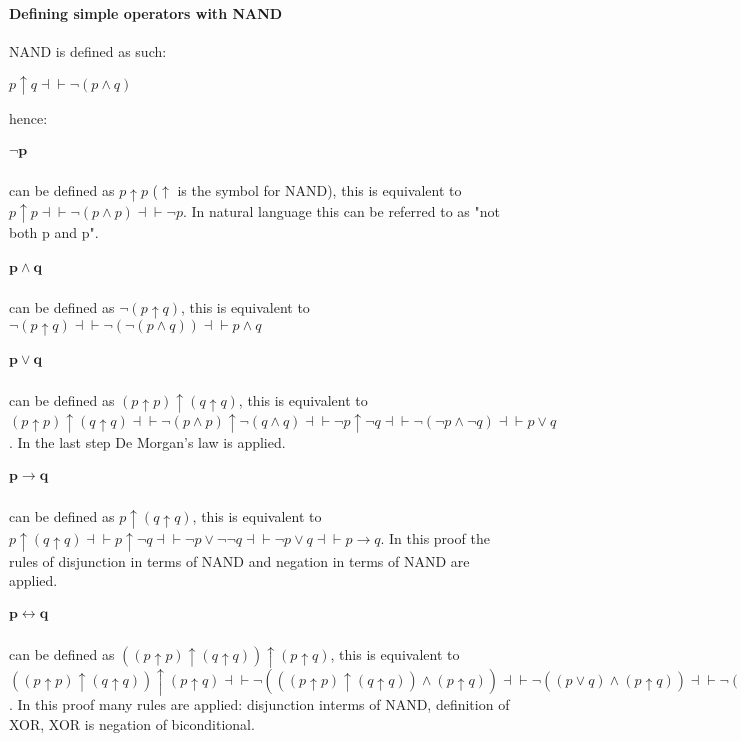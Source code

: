 \documentclass[11pt]{exam}
\begin{document}
\paragraph*{Defining simple operators with NAND} \hfill \break
NAND is defined as such:
\begin{center}
    \(p \uparrow q \dashv \vdash \neg(p \wedge q)\)
\end{center}
hence:
\subparagraph*{\(\bm{\neg p}\)}
can be defined as \(p \uparrow p\) (\(\uparrow\) is the symbol for NAND), this is equivalent to \(p \uparrow p \dashv \vdash \neg(p \wedge p) \dashv \vdash \neg p\). In natural language this can be referred to as "not both p and p".
\subparagraph*{\(\bm{p \wedge q}\)}
can be defined as \(\neg(p \uparrow q)\), this is equivalent to \(\neg(p \uparrow q) \dashv \vdash \neg(\neg(p \wedge q)) \dashv \vdash p \wedge q\)
\subparagraph*{\(\bm{p \vee q}\)}
can be defined as \((p \uparrow p) \uparrow (q \uparrow q)\), this is equivalent to \((p \uparrow p) \uparrow (q \uparrow q) \dashv \vdash \neg(p \wedge p) \uparrow \neg(q \wedge q) \dashv \vdash \neg p \uparrow \neg q \dashv \vdash \neg (\neg p \wedge \neg q) \dashv \vdash p \vee q\). In the last step De Morgan's law is applied.
\subparagraph*{\(\bm{p \rightarrow q}\)}
can be defined as \(p \uparrow (q \uparrow q)\), this is equivalent to \(p \uparrow (q \uparrow q) \dashv \vdash p \uparrow \neg q \dashv \vdash \neg p \vee \neg \neg q \dashv \vdash \neg p \vee q \dashv \vdash p \rightarrow q\). In this proof the rules of disjunction in terms of NAND and negation in terms of NAND are applied.
\subparagraph*{\(\bm{p \leftrightarrow q}\)}
can be defined as \(((p \uparrow p) \uparrow (q \uparrow q)) \uparrow (p \uparrow q)\), this is equivalent to \(((p \uparrow p) \uparrow (q \uparrow q)) \uparrow (p \uparrow q) \dashv \vdash \neg(((p \uparrow p) \uparrow (q \uparrow q)) \wedge (p \uparrow q)) \dashv \vdash \neg((p \vee q) \wedge (p \uparrow q)) \dashv \vdash \neg((p \vee q) \wedge \neg (p \wedge q)) \dashv \vdash \neg(p \oplus q) \dashv \vdash p \leftrightarrow q\). In this proof many rules are applied: disjunction interms of NAND, definition of XOR, XOR is negation of biconditional.
\end{document}
